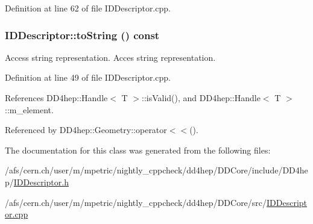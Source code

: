 Definition at line 62 of file IDDescriptor.cpp.\hypertarget{class_d_d4hep_1_1_geometry_1_1_i_d_descriptor_ad147d0eaa67a3a248c35d86b7aa7a4b7}{
\subsubsection[{toString}]{ IDDescriptor::toString () const}}
\label{class_d_d4hep_1_1_geometry_1_1_i_d_descriptor_ad147d0eaa67a3a248c35d86b7aa7a4b7}


Access string representation. Acces string representation. 

Definition at line 49 of file IDDescriptor.cpp.

References DD4hep::Handle$<$ T $>$::isValid(), and DD4hep::Handle$<$ T $>$::m\_\-element.

Referenced by DD4hep::Geometry::operator$<$$<$().

The documentation for this class was generated from the following files:\begin{DoxyCompactItemize}
\item 
/afs/cern.ch/user/m/mpetric/nightly\_\-cppcheck/dd4hep/DDCore/include/DD4hep/\hyperlink{_i_d_descriptor_8h}{IDDescriptor.h}\item 
/afs/cern.ch/user/m/mpetric/nightly\_\-cppcheck/dd4hep/DDCore/src/\hyperlink{_i_d_descriptor_8cpp}{IDDescriptor.cpp}\end{DoxyCompactItemize}
